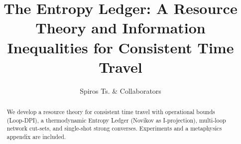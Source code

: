 \documentclass{nature}
\title{The Entropy Ledger: A Resource Theory and Information Inequalities for Consistent Time Travel}
\author{Spiros Ts. \& Collaborators}
\begin{document}
\maketitle

\begin{abstract}
We develop a resource theory for consistent time travel with operational bounds (Loop-DPI), a thermodynamic Entropy Ledger (Novikov as I-projection), multi-loop network cut-sets, and single-shot strong converses. Experiments and a metaphysics appendix are included.
\end{abstract}












\end{document}
